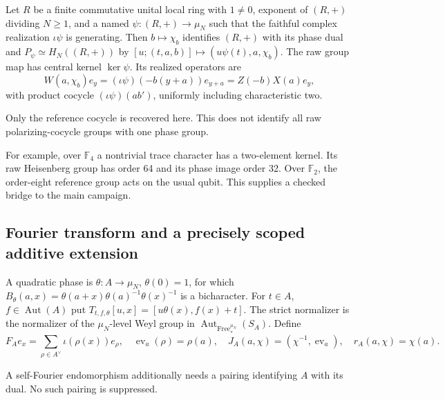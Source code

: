 \begin{theorem}
{\normalfont\statusProved}\quad Let $R$ be a finite commutative unital local
ring with $1\ne0$, exponent of $(R,+)$ dividing $N\geq1$, and a named
$\psi:(R,+)\to\mu_N$ such that the faithful complex realization
$\iota\psi$ is generating. Then
$b\mapsto\chi_b$ identifies $(R,+)$ with its phase dual and
$P_\psi\simeq H_N((R,+))$ by
$[u;(t,a,b)]\mapsto(u\psi(t),a,\chi_b)$.
The raw group map has central kernel $\ker\psi$. Its realized operators are
\[
W(a,\chi_b)e_y=(\iota\psi)(-b(y+a))e_{y+a}=Z(-b)X(a)e_y,
\]
with product cocycle $(\iota\psi)(ab')$, uniformly including characteristic two.
\end{theorem}
\begin{scope}Only the reference cocycle is recovered here. This does not
identify all raw polarizing-cocycle groups with one phase group.\end{scope}

For example, over $\mathbb F_4$ a nontrivial trace character has a
two-element kernel. Its raw Heisenberg group has order 64 and its phase
image order 32. Over $\mathbb F_2$, the order-eight reference group acts
on the usual qubit. This supplies a checked bridge to the main campaign.

\subsection{Fourier transform and a precisely scoped additive extension}

\begin{definition}
A quadratic phase is $\theta:A\to\mu_N$, $\theta(0)=1$, for which
$B_\theta(a,x)=\theta(a+x)\theta(a)^{-1}\theta(x)^{-1}$ is a bicharacter.
For $t\in A$, $f\in\operatorname{Aut}(A)$ put
$T_{t,f,\theta}[u,x]=[u\theta(x),f(x)+t]$. The strict normalizer is the
normalizer of the $\mu_N$-level Weyl group in
$\operatorname{Aut}_{\mathrm{Free}_*^{\mu_N}}(S_A)$. Define
\[
F_Ae_x=\sum_{\rho\in A^\vee}\iota(\rho(x))e_\rho,\quad
\operatorname{ev}_a(\rho)=\rho(a),\quad
J_A(a,\chi)=(\chi^{-1},\operatorname{ev}_a),\quad r_A(a,\chi)=\chi(a).
\]
\end{definition}
\begin{scope}A self-Fourier endomorphism additionally needs a pairing
identifying $A$ with its dual. No such pairing is suppressed.\end{scope}

